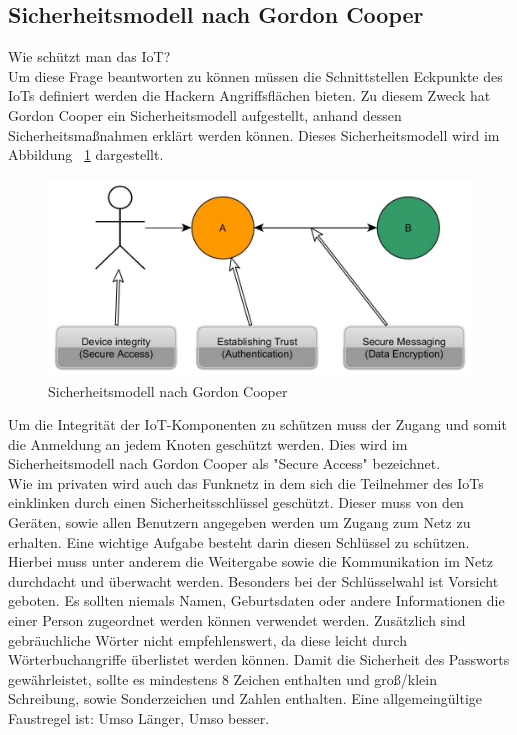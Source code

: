 \subsection{Sicherheitsmodell nach Gordon Cooper}\label{ss:Sicherheitsmodell}


Wie schützt man das \ac{IoT}?\\

Um diese Frage beantworten zu können müssen die Schnittstellen Eckpunkte des \ac{IoT}s definiert werden die Hackern Angriffsflächen bieten. Zu diesem Zweck hat Gordon Cooper ein Sicherheitsmodell aufgestellt, anhand dessen Sicherheitsmaßnahmen erklärt werden können. Dieses Sicherheitsmodell wird im Abbildung ~\ref{f:security} dargestellt.

\vspace{5 mm}
\begin{figure}[H] 
	\centering
	\includegraphics[scale=0.4]{Bilder/sicherheitsmodell}
	\caption{Sicherheitsmodell nach Gordon Cooper\cite{z:DesignElektronik}}
	\label{f:security}
\end{figure}
\vspace{5 mm}

Um die Integrität der \ac{IoT}-Komponenten zu schützen muss der Zugang und somit die Anmeldung an jedem Knoten geschützt werden. Dies wird im Sicherheitsmodell nach Gordon Cooper als "Secure Access" bezeichnet.\\
Wie im privaten wird auch das Funknetz in dem sich die Teilnehmer des \ac{IoT}s einklinken durch einen Sicherheitsschlüssel geschützt. Dieser muss von den Geräten, sowie allen Benutzern angegeben werden um Zugang zum Netz zu erhalten. Eine wichtige Aufgabe besteht darin diesen Schlüssel zu schützen. Hierbei muss unter anderem die Weitergabe sowie die Kommunikation im Netz durchdacht und überwacht werden. Besonders bei der Schlüsselwahl ist Vorsicht geboten. Es sollten niemals Namen, Geburtsdaten oder andere Informationen die einer Person zugeordnet werden können verwendet werden. Zusätzlich sind gebräuchliche Wörter nicht empfehlenswert, da diese leicht durch Wörterbuchangriffe überlistet werden können. Damit die Sicherheit des Passworts gewährleistet, sollte es mindestens 8 Zeichen enthalten und groß/klein Schreibung, sowie Sonderzeichen und Zahlen enthalten. Eine allgemeingültige Faustregel ist: Umso Länger, Umso besser.\\

